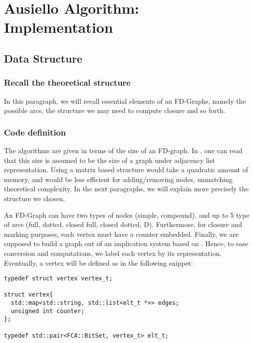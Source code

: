 \section{Ausiello Algorithm: Implementation}

\subsection{Data Structure}

\subsubsection{Recall the theoretical structure}

In this paragraph, we will recall essential elements of an FD-Graphs, namely
the possible arcs, the structure we may need to compute closure and so forth.

\subsubsection{Code definition}

The algorithms are given in terms of the size of an FD-graph. In 
\cite{ausiello_minimal_1986}, one can read that this size is assumed to be the
size of a graph under adjacency list representation. Using a matrix based 
structure would take a quadratic amount of memory, and would be less efficient
for adding/removing nodes, unmatching theoretical complexity. In the next
paragraphs, we will explain more precisely the structure we chosen.

\vspace{1.2em}

An FD-Graph can have two types of nodes (simple, compound), and up to 5 type
of arcs (full, dotted, closed full, closed dotted, D). Furthermore, for closure
and marking purposes, each vertex must have a counter embedded. Finally, we
are supposed to build a graph out of an implication system based on 
. Hence, to ease conversion and computations, we label each vertex
by its  representation. Eventually, a vertex will be defined as in 
the following snippet:

\begin{lstlisting}[language=CoreCpp, style=Light, breaklines=true]
typedef struct vertex vertex_t;

struct vertex{
  std::map<std::string, std::list<elt_t *>> edges;
  unsigned int counter;
};

typedef std::pair<FCA::BitSet, vertex_t> elt_t;

\end{lstlisting}

